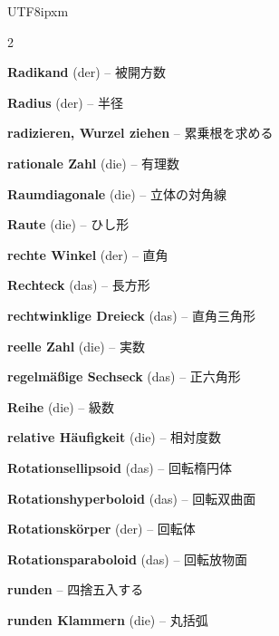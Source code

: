 \begin{CJK}{UTF8}{ipxm}
\begin{multicols}{2}
\par\nopagebreak
\textbf{Radikand} (der) -- 被開方数\dotfill\hyperref[e:48]{\pageref*{e:48}}\par
\textbf{Radius} (der) -- 半径\dotfill\hyperref[e:213]{\pageref*{e:213}}\par
\textbf{radizieren, Wurzel ziehen} -- 累乗根を求める\dotfill\hyperref[e:52]{\pageref*{e:52}}\par
\textbf{rationale Zahl} (die) -- 有理数\dotfill\hyperref[e:7]{\pageref*{e:7}}\par
\textbf{Raumdiagonale} (die) -- 立体の対角線\dotfill\hyperref[e:252]{\pageref*{e:252}}\par
\textbf{Raute} (die) -- ひし形\dotfill\hyperref[e:201]{\pageref*{e:201}}\par
\textbf{rechte Winkel} (der) -- 直角\dotfill\hyperref[e:158]{\pageref*{e:158}}\par
\textbf{Rechteck} (das) -- 長方形\dotfill\hyperref[e:199]{\pageref*{e:199}}\par
\textbf{rechtwinklige Dreieck} (das) -- 直角三角形\dotfill\hyperref[e:181]{\pageref*{e:181}}\par
\textbf{reelle Zahl} (die) -- 実数\dotfill\hyperref[e:8]{\pageref*{e:8}}\par
\textbf{regelmäßige Sechseck} (das) -- 正六角形\dotfill\hyperref[e:205]{\pageref*{e:205}}\par
\textbf{Reihe} (die) -- 級数\dotfill\hyperref[e:265]{\pageref*{e:265}}\par
\textbf{relative Häufigkeit} (die) -- 相対度数\dotfill\hyperref[e:331]{\pageref*{e:331}}\par
\textbf{Rotationsellipsoid} (das) -- 回転楕円体\dotfill\hyperref[e:242]{\pageref*{e:242}}\par
\textbf{Rotationshyperboloid} (das) -- 回転双曲面\dotfill\hyperref[e:244]{\pageref*{e:244}}\par
\textbf{Rotationskörper} (der) -- 回転体\dotfill\hyperref[e:239]{\pageref*{e:239}}\par
\textbf{Rotationsparaboloid} (das) -- 回転放物面\dotfill\hyperref[e:243]{\pageref*{e:243}}\par
\textbf{runden} -- 四捨五入する\dotfill\hyperref[e:59]{\pageref*{e:59}}\par
\textbf{runden Klammern} (die) -- 丸括弧\dotfill\hyperref[e:88]{\pageref*{e:88}}\par


\end{multicols}
\end{CJK}

